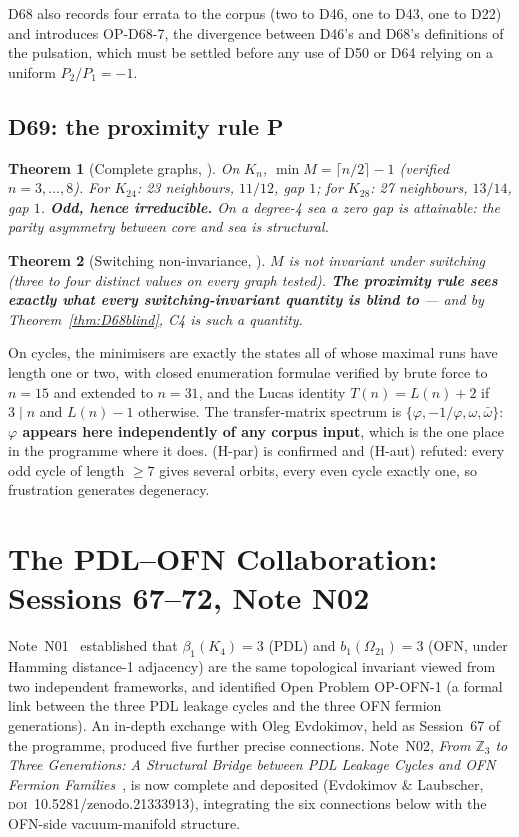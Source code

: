 \documentclass[11pt,a4paper]{article}
\theoremstyle{plain}
\newtheorem{theorem}{Theorem}[section]
\theoremstyle{definition}
\theoremstyle{remark}
\newcommand{\Kfour}{K_4}
\begin{document}
D68 also records four errata to the corpus (two to D46, one to D43, one to D22) and introduces OP-D68-7, the divergence between D46's and D68's definitions of the pulsation, which must be settled before any use of D50 or D64 relying on a uniform $P_2/P_1=-1$.

\subsection{D69: the proximity rule P}
\label{subsec:D69}
\begin{theorem}[Complete graphs, \cite{D69}]
\label{thm:D69Kn}
On $K_n$, $\min M=\lceil n/2\rceil-1$ (verified $n=3,\ldots,8$). For $K_{24}$: 23 neighbours, $11/12$, gap $1$; for $K_{28}$: 27 neighbours, $13/14$, gap $1$. \textbf{Odd, hence irreducible.} On a degree-4 sea a zero gap is attainable: the parity asymmetry between core and sea is structural.
\end{theorem}

\begin{theorem}[Switching non-invariance, \cite{D69}]
\label{thm:D69switch}
$M$ is not invariant under switching (three to four distinct values on every graph tested). \textbf{The proximity rule sees exactly what every switching-invariant quantity is blind to} --- and by Theorem~\ref{thm:D68blind}, C4 is such a quantity.
\end{theorem}

On cycles, the minimisers are exactly the states all of whose maximal runs have length one or two, with closed enumeration formulae verified by brute force to $n=15$ and extended to $n=31$, and the Lucas identity $T(n)=L(n)+2$ if $3\mid n$ and $L(n)-1$ otherwise. The transfer-matrix spectrum is $\{\varphi,-1/\varphi,\omega,\bar\omega\}$: \textbf{$\varphi$ appears here independently of any corpus input}, which is the one place in the programme where it does. (H-par) is confirmed and (H-aut) refuted: every odd cycle of length $\geq7$ gives several orbits, every even cycle exactly one, so frustration generates degeneracy.

\section{The PDL--OFN Collaboration: Sessions 67--72, Note N02}
\label{sec:PDLOFN}

Note~N01~\cite{N01} established that $\beta_1(\Kfour)=3$ (PDL) and $b_1(\Omega_{21})=3$ (OFN, under Hamming distance-1 adjacency) are the same topological invariant viewed from two independent frameworks, and identified Open Problem OP-OFN-1 (a formal link between the three PDL leakage cycles and the three OFN fermion generations). An in-depth exchange with Oleg Evdokimov, held as Session~67 of the programme, produced five further precise connections. Note~N02, \emph{From $\mathbb{Z}_3$ to Three Generations: A Structural Bridge between PDL Leakage Cycles and OFN Fermion Families}~\cite{N02}, is now complete and deposited (Evdokimov \& Laubscher, \textsc{doi}~10.5281/zenodo.21333913), integrating the six connections below with the OFN-side vacuum-manifold structure.
\end{document}
